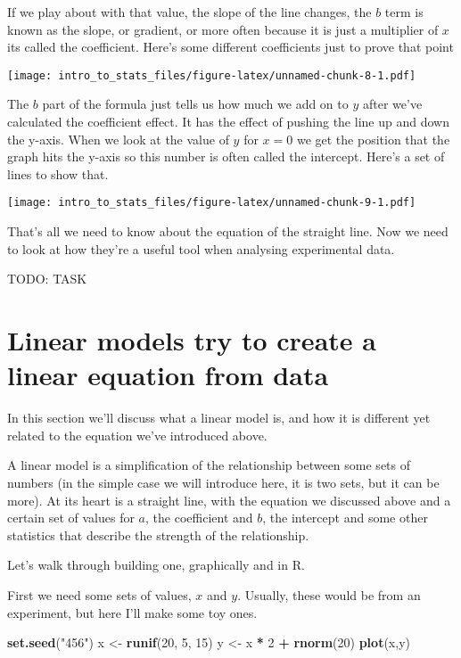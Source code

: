 \documentclass[]{book}
\newenvironment{Shaded}{\begin{snugshade}}{\end{snugshade}}
\newcommand{\DecValTok}[1]{\textcolor[rgb]{0.00,0.00,0.81}{#1}}
\newcommand{\KeywordTok}[1]{\textcolor[rgb]{0.13,0.29,0.53}{\textbf{#1}}}
\newcommand{\NormalTok}[1]{#1}
\newcommand{\OperatorTok}[1]{\textcolor[rgb]{0.81,0.36,0.00}{\textbf{#1}}}
\newcommand{\StringTok}[1]{\textcolor[rgb]{0.31,0.60,0.02}{#1}}
\begin{document}
If we play about with that value, the slope of the line changes, the \(b\) term is known as the slope, or gradient, or more often because it is just a multiplier of \(x\) its called the coefficient. Here's some different coefficients just to prove that point

\texttt{[image: intro\_to\_stats\_files/figure-latex/unnamed-chunk-8-1.pdf]}

The \(b\) part of the formula just tells us how much we add on to \(y\) after we've calculated the coefficient effect. It has the effect of pushing the line up and down the y-axis. When we look at the value of \(y\) for \(x = 0\) we get the position that the graph hits the y-axis so this number is often called the intercept. Here's a set of lines to show that.

\texttt{[image: intro\_to\_stats\_files/figure-latex/unnamed-chunk-9-1.pdf]}

That's all we need to know about the equation of the straight line. Now we need to look at how they're a useful tool when analysing experimental data.

TODO: TASK

\hypertarget{linear-models-try-to-create-a-linear-equation-from-data}{%
\section{Linear models try to create a linear equation from data}\label{linear-models-try-to-create-a-linear-equation-from-data}}

In this section we'll discuss what a linear model is, and how it is different yet related to the equation we've introduced above.

A linear model is a simplification of the relationship between some sets of numbers (in the simple case we will introduce here, it is two sets, but it can be more). At its heart is a straight line, with the equation we discussed above and a certain set of values for \(a\), the coefficient and \(b\), the intercept and some other statistics that describe the strength of the relationship.

Let's walk through building one, graphically and in R.

First we need some sets of values, \(x\) and \(y\). Usually, these would be from an experiment, but here I'll make some toy ones.

\begin{Shaded}
\begin{Highlighting}[]
\KeywordTok{set.seed}\NormalTok{(}\StringTok{"456"}\NormalTok{)}
\NormalTok{x <-}\StringTok{ }\KeywordTok{runif}\NormalTok{(}\DecValTok{20}\NormalTok{, }\DecValTok{5}\NormalTok{, }\DecValTok{15}\NormalTok{)}
\NormalTok{y <-}\StringTok{ }\NormalTok{x }\OperatorTok{*}\StringTok{ }\DecValTok{2} \OperatorTok{+}\StringTok{ }\KeywordTok{rnorm}\NormalTok{(}\DecValTok{20}\NormalTok{)}
\KeywordTok{plot}\NormalTok{(x,y)}
\end{Highlighting}
\end{Shaded}
\end{document}
